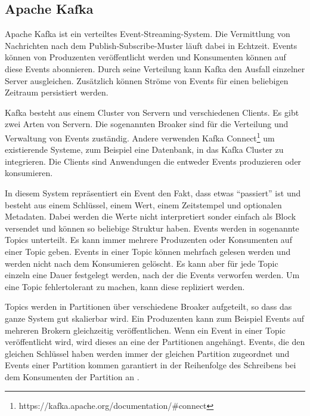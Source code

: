 \subsection{Apache Kafka}

Apache Kafka ist ein verteiltes Event-Streaming-System.
Die Vermittlung von Nachrichten nach dem Publish-Subscribe-Muster läuft dabei in Echtzeit.
Events können von Produzenten veröffentlicht werden und Konsumenten können auf diese Events abonnieren.
Durch seine Verteilung kann Kafka den Ausfall einzelner Server ausgleichen.
Zusätzlich können Ströme von Events für einen beliebigen Zeitraum persistiert werden.

Kafka besteht aus einem Cluster von Servern und verschiedenen Clients.
Es gibt zwei Arten von Servern.
Die sogenannten Broaker sind für die Verteilung und Verwaltung von Events zuständig.
Andere verwenden Kafka Connect\footnote{https://kafka.apache.org/documentation/\#connect} um existierende Systeme, zum Beispiel eine Datenbank, in das Kafka Cluster zu integrieren.
Die Clients sind Anwendungen die entweder Events produzieren oder konsumieren.

In diesem System repräsentiert ein Event den Fakt, dass etwas "`passiert"' ist und besteht aus einem Schlüssel, einem Wert, einem Zeitstempel und optionalen Metadaten.
Dabei werden die Werte nicht interpretiert sonder einfach als Block versendet und können so beliebige Struktur haben.
Events werden in sogenannte Topics unterteilt.
Es kann immer mehrere Produzenten oder Konsumenten auf einer Topic geben.
Events in einer Topic können mehrfach gelesen werden und werden nicht nach dem Konsumieren gelöscht.
Es kann aber für jede Topic einzeln eine Dauer festgelegt werden, nach der die Events verworfen werden.
Um eine Topic fehlertolerant zu machen, kann diese repliziert werden.

Topics werden in Partitionen über verschiedene Broaker aufgeteilt, so dass das ganze System gut skalierbar wird.
Ein Produzenten kann zum Beispiel Events auf mehreren Brokern gleichzeitig veröffentlichen.
Wenn ein Event in einer Topic veröffentlicht wird, wird dieses an eine der Partitionen angehängt.
Events, die den gleichen Schlüssel haben werden immer der gleichen Partition zugeordnet und Events einer Partition kommen garantiert in der Reihenfolge des Schreibens bei dem Konsumenten der Partition an \parencite{kafka-docs}.